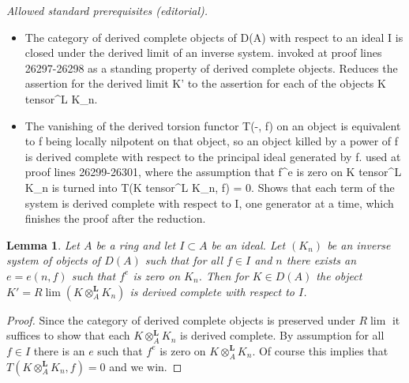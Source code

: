 \documentclass[10pt,a4paper]{amsart}
\theoremstyle{plain}
\newtheorem{lemma}[subsection]{Lemma}
\theoremstyle{definition}
\theoremstyle{remark}
\numberwithin{equation}{subsection}
\def\lim{\mathop{\mathrm{lim}}\nolimits}
\begin{document}
\noindent\textit{Allowed standard prerequisites (editorial).}\begin{itemize}
\item The category of derived complete objects of D(A) with respect to an ideal I is closed under the derived limit of an inverse system. invoked at proof lines 26297-26298 as a standing property of derived complete objects. Reduces the assertion for the derived limit K' to the assertion for each of the objects K tensor\textasciicircum{}L K\_n.
\item The vanishing of the derived torsion functor T(-, f) on an object is equivalent to f being locally nilpotent on that object, so an object killed by a power of f is derived complete with respect to the principal ideal generated by f. used at proof lines 26299-26301, where the assumption that f\textasciicircum{}e is zero on K tensor\textasciicircum{}L K\_n is turned into T(K tensor\textasciicircum{}L K\_n, f) = 0. Shows that each term of the system is derived complete with respect to I, one generator at a time, which finishes the proof after the reduction.
\end{itemize}\medskip
\begin{lemma}
\label{lemma-naive-derived-completion}
Let $A$ be a ring and let $I \subset A$ be an ideal. Let $(K_n)$ be an inverse
system of objects of $D(A)$ such that for all $f \in I$ and $n$
there exists an $e = e(n, f)$ such that $f^e$ is zero on $K_n$.
Then for $K \in D(A)$ the object $K' = R\lim (K \otimes_A^\mathbf{L} K_n)$
is derived complete with respect to $I$.
\end{lemma}

\begin{proof}
Since the category of derived complete objects is preserved under $R\lim$
it suffices to show that each $K \otimes_A^\mathbf{L} K_n$ is derived
complete. By assumption for all $f \in I$ there is an $e$ such
that $f^e$ is zero on $K \otimes_A^\mathbf{L} K_n$. Of course this
implies that $T(K \otimes_A^\mathbf{L} K_n, f) = 0$ and we win.
\end{proof}
\end{document}
